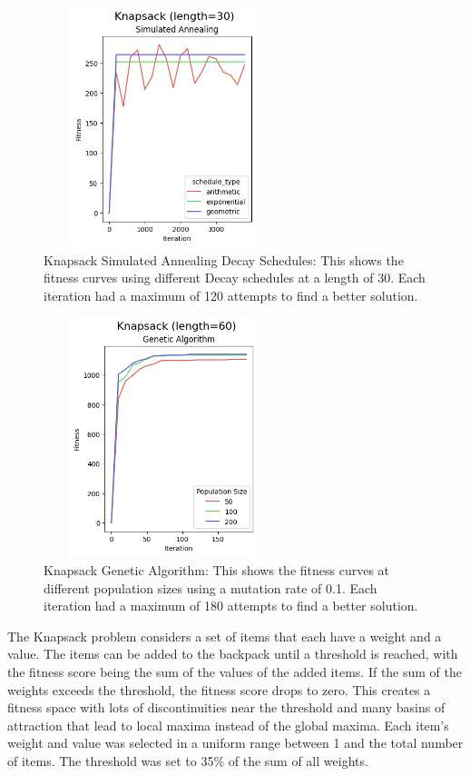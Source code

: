 \documentclass[letterpaper]{article} %
\begin{document}
\begin{figure}[!htb]
\centering
\includegraphics[width=2.75in, height=2.75in]{figures/Knapsack_length=30_Simulated_Annealing_l_30_ma_120_d_geom__arith__exp_t_10_.png}
\caption{Knapsack Simulated Annealing Decay Schedules: This shows the fitness curves using different Decay schedules at a length of 30. Each iteration had a maximum of 120 attempts to find a better solution. }
\label{fig:knapsack_sa_decay}
\end{figure}

\begin{figure}[!htb]
\centering
\includegraphics[width=2.75in, height=2.75in]{figures/Knapsack_length=60_Genetic_Algorithm_l_60_ma_60_p_50__100__200_mu_0.1_.png}
\caption{Knapsack Genetic Algorithm: This shows the fitness curves at different population sizes using a mutation rate of 0.1. Each iteration had a maximum of 180 attempts to find a better solution. }
\label{fig:knapsack_ga}
\end{figure}

The Knapsack problem considers a set of items that each have a weight and a value.  The items can be added to the backpack until a threshold is reached, with the fitness score being the sum of the values of the added items.  If the sum of the weights exceeds the threshold, the fitness score drops to zero.  This creates a fitness space with lots of discontinuities near the threshold and many basins of attraction that lead to local maxima instead of the global maxima.   Each item's weight and value was selected in a uniform range between 1 and the total number of items.  The threshold was set to 35\% of the sum of all weights.
\end{document}
